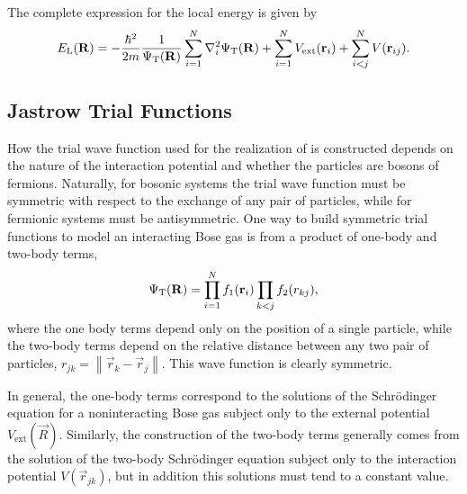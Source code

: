 The complete expression for the local energy is given by
%
\begin{equation}
  \label{eq:local-energy}
  E_{\mathrm{L}}(\mathbf R) = -\frac{\hbar^2}{2m} \frac{1}{\Psi_{\mathrm{T}}(\mathbf R)} \sum_{i=1}^{N} \mathbf{\nabla}^2_{i} \Psi_{\mathrm{T}}(\mathbf R) +
  \sum_{i=1}^{N} V_{\mathrm{ext}}(\mathbf r_i) + \sum_{i < j}^{N} V(\mathbf{r}_{ij}).
\end{equation}




\subsection{Jastrow Trial Functions}

How the trial wave function used for the realization of {\VMC} is constructed
depends on the nature of the interaction potential and whether the particles are
bosons of fermions. Naturally, for bosonic systems the trial wave function must
be symmetric with respect to the exchange of any pair of particles, while for
fermionic systems must be antisymmetric. One way to build symmetric trial
functions to model an interacting Bose gas is from a product of one-body and
two-body terms,
%
\begin{equation}
  \label{eq:vmc-jastrow-trial-function}
  \Psi_{\mathrm{T}}(\mathbf R) = \prod_{i=1}^{N} f_1(\mathbf r_i) \prod_{k < j} f_2(r_{kj}),
\end{equation}
%
where the one body terms depend only on the position of a single particle, while
the two-body terms depend on the relative distance between any two pair of
particles, $r_{jk} = \left\| \vec r_k - \vec r_j \right\|$. This wave function
is clearly symmetric.

In general, the one-body terms correspond to the solutions of the Schrödinger
equation for a noninteracting Bose gas subject only to the external potential
$V_{\textrm{ext}}(\vec R)$. Similarly, the construction of the two-body terms
generally comes from the solution of the two-body Schrödinger equation subject
only to the interaction potential $V(\vec r_{jk})$, but in addition this
solutions must tend to a constant value.




